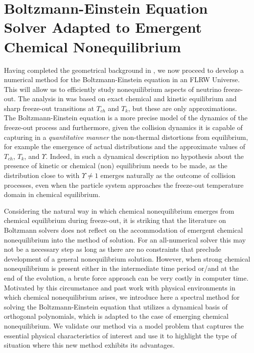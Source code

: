 \section{Boltzmann-Einstein Equation Solver Adapted to Emergent Chemical Nonequilibrium}\label{ch:boltz:orthopoly}
Having completed the geometrical background in , we now proceed to develop a numerical method for the Boltzmann-Einstein equation in an FLRW Universe.  This will allow us to efficiently study  nonequilibrium aspects of neutrino freeze-out. The analysis in  was based on exact chemical and kinetic equilibrium and sharp freeze-out transitions at $T_{ch}$ and $T_k$, but these are  only approximations.  The  Boltzmann-Einstein equation is a more precise model of the dynamics of the freeze-out process and furthermore, given the collision dynamics it is capable of capturing in a {\em quantitative manner} the non-thermal distortions from equilibrium, for example the emergence of actual distributions and the approximate values  of $T_{ch}$, $T_k$, and $\Upsilon$.  Indeed,  in  such a dynamical description no hypothesis about the presence of kinetic or chemical (non) equilibrium needs to be made, as the distribution close to  with   $\Upsilon\ne  1$ emerges naturally as the outcome of collision processes, even when the particle system approaches the freeze-out temperature domain  in chemical equilibrium.

Considering the natural way in which chemical nonequilibrium emerges from chemical equilibrium during freeze-out, it is striking that the literature on Boltzmann solvers does not reflect on the accommodation of emergent chemical nonequilibrium into the method of solution. For an all-numerical solver this may not be a necessary step as long as there are no constraints that preclude development of a general nonequilibrium solution. However, when strong chemical nonequilibrium is present either in the intermediate time period or/and at the end of the evolution, a brute force approach can be very costly in computer time. Motivated by this circumstance and past work with physical environments in which chemical nonequilibrium arises,  we introduce here a  spectral method for solving the Boltzmann-Einstein equation that utilizes a dynamical basis of orthogonal polynomials, which is adapted to the case of emerging chemical nonequilibrium. We validate our method via a  model problem  that captures the essential physical characteristics of interest and use it to highlight the type of situation where this new method exhibits its advantages.

